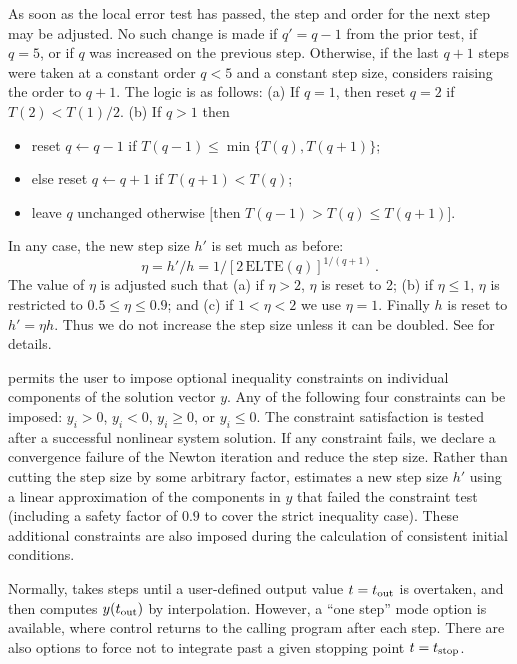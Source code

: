As soon as the local error test has passed, the step and order for the
next step may be adjusted.  No such change is made if $q' = q-1$ from
the prior test, if $q = 5$, or if $q$ was increased on the previous
step.  Otherwise, if the last $q+1$ steps were taken at a constant
order $q < 5$ and a constant step size, {\idas} considers raising the order
to $q+1$.  The logic is as follows: (a) If $q = 1$, then reset $q = 2$
if $T(2) < T(1)/2$.  (b) If $q > 1$ then 
\begin{itemize}
\item reset $q \leftarrow q-1$ if $T(q-1) \leq \min\{T(q),T(q+1)\}$;
\item else reset $q \leftarrow q+1$ if $T(q+1) < T(q)$;
\item leave $q$ unchanged otherwise $[$then $T(q-1) > T(q) \leq T(q+1)]$.
\end{itemize}
In any case, the new step size $h'$ is set much as before:
\[ \eta = h'/h = 1/[2 \, \mbox{ELTE}(q)]^{1/(q+1)} \, . \]
The value of $\eta$ is adjusted such that (a) if $\eta > 2$, $\eta$ is
reset to 2; (b) if $\eta \leq 1$, $\eta$ is restricted to 
$0.5 \leq \eta \leq 0.9$; and (c) if $1 < \eta < 2$ we use $\eta = 1$.
Finally $h$ is reset to $h' = \eta h$.  Thus we do not increase the
step size unless it can be doubled.  See \cite{BCP:96} for details.

{\idas} permits the user to impose optional inequality constraints on individual 
components of the solution vector $y$. Any of the following four constraints 
can be imposed: $y_i > 0$, $y_i < 0$, $y_i \geq 0$, or $y_i \leq 0$. 
The constraint satisfaction is tested after a successful nonlinear system solution. 
If any constraint fails, we declare a convergence failure of the Newton iteration 
and reduce the step size. Rather than cutting the step size by some arbitrary factor, 
{\idas} estimates a new step size $h'$ using a linear approximation of the components 
in $y$ that failed the constraint test (including a safety factor of $0.9$ to 
cover the strict inequality case). These additional constraints are also imposed
during the calculation of consistent initial conditions.

Normally, {\idas} takes steps until a user-defined output value $t =
t_{\mbox{\scriptsize out}}$ is overtaken, and then computes
$y(t_{\mbox{\scriptsize out}})$ by interpolation.  However, a
``one step'' mode option is available, where control returns to the
calling program after each step.  There are also options to force {\idas}
not to integrate past a given stopping point $t = t_{\mbox{\scriptsize
stop}}$.


